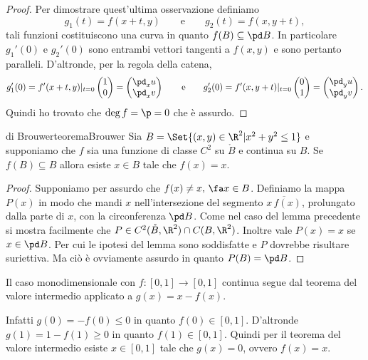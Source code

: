 \begin{proof}
	Per dimostrare quest'ultima osservazione definiamo
	\[
		g_1(t) = f(x+t,y) \qquad\text{e}\qquad g_2(t) = f(x,y+t),
	\]
	tali funzioni costituiscono una curva in quanto \(f(B)\subseteq \pd B\).
	In particolare \(g_1'(0)\) e \(g_2'(0)\) sono entrambi vettori tangenti a \(f(x,y)\) e sono pertanto paralleli.
	D'altronde, per la regola della catena,
	\[
		g_1'(0) = f'(x+t,y)|_{t=0} \begin{pmatrix}1\\0\end{pmatrix} = \begin{pmatrix}\pd_x u\\\pd_x v\end{pmatrix}
		\qquad\text{e}\qquad
		g_2'(0) = f'(x,y+t)|_{t=0} \begin{pmatrix}0\\1\end{pmatrix} = \begin{pmatrix}\pd_y u\\\pd_y v\end{pmatrix}.
	\]
	Quindi ho trovato che \(\deg f = \p = 0\) che è assurdo.
\end{proof}

\begin{teor}{di Brouwer}{teoremaBrouwer}
	Sia \(B=\Set{(x,y) \in \R^2 | x^2+y^2 \le 1}\) e supponiamo che \(f\) sia una funzione di classe \(C^2\) su \(\mathring{B}\) e continua su \(B\).
	Se \(f(B)\subseteq B\) allora esiste \(x\in B\) tale che \(f(x)=x\).
\end{teor}

\begin{proof}
	Supponiamo per assurdo che \(f(x)\neq x,\,\fa x\in B\).
	Definiamo la mappa \(P(x)\) in modo che mandi \(x\) nell'intersezione del segmento \(\overline{x\,f(x)}\), prolungato dalla parte di \(x\), con la circonferenza \(\pd B\).
	Come nel caso del lemma precedente si mostra facilmente che \(P\in C^2(\mathring{B},\R^2)\cap C(B,\R^2)\).
	Inoltre vale \(P(x)=x\) se \(x\in \pd B\).
	Per cui le ipotesi del lemma sono soddisfatte e \(P\) dovrebbe risultare suriettiva.
	Ma ciò è ovviamente assurdo in quanto \(P(B)=\pd B\).
\end{proof}

\begin{oss}
	Il caso monodimensionale con \(f\colon [0,1] \to [0,1]\) continua segue dal teorema del valore intermedio applicato a \(g(x)=x-f(x)\).

	Infatti \(g(0)=-f(0)\le0\) in quanto \(f(0)\in[0,1]\).
	D'altronde \(g(1)=1-f(1)\ge 0\) in quanto \(f(1)\in[0,1]\).
	Quindi per il teorema del valore intermedio esiste \(x\in[0,1]\) tale che \(g(x)=0\), ovvero \(f(x)=x\).
\end{oss}
